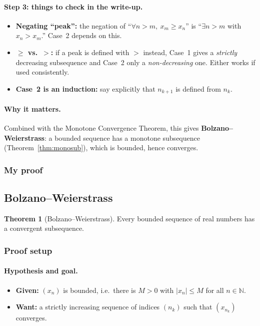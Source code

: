 \documentclass[11pt]{article}
\theoremstyle{definition}
\newtheorem{thm}[defn]{Theorem}
\newcommand{\N}{\mathbb{N}}
\begin{document}
\paragraph{Step 3: things to check in the write-up.}
\begin{itemize}[nosep]
  \item \textbf{Negating ``peak'':} the negation of
        ``$\forall n>m,\ x_m\ge x_n$'' is
        ``$\exists n>m$ with $x_n>x_m$.'' Case~2 depends on this.
  \item \textbf{$\ge$ vs.\ $>$:} if a peak is defined with $>$ instead,
        Case~1 gives a \emph{strictly} decreasing subsequence and Case~2
        only a \emph{non-decreasing} one. Either works if used consistently.
  \item \textbf{Case~2 is an induction:} say explicitly that $n_{k+1}$ is
        defined from $n_k$.
\end{itemize}

\paragraph{Why it matters.}
Combined with the Monotone Convergence Theorem, this gives
\textbf{Bolzano--Weierstrass}: a bounded sequence has a monotone
subsequence (Theorem~\ref{thm:monosub}), which is bounded, hence converges.

\subsubsection*{My proof}

\subsection{Bolzano--Weierstrass}

\begin{thm}[Bolzano--Weierstrass]\label{thm:bw}
Every bounded sequence of real numbers has a convergent subsequence.
\end{thm}

\subsubsection*{Proof setup}

\paragraph{Hypothesis and goal.}
\begin{itemize}[nosep]
  \item \textbf{Given:} $(x_n)$ is bounded, i.e.\ there is $M>0$ with
        $|x_n|\le M$ for all $n\in\N$.
  \item \textbf{Want:} a strictly increasing sequence of indices
        $(n_k)$ such that $(x_{n_k})$ converges.
\end{itemize}
\end{document}
